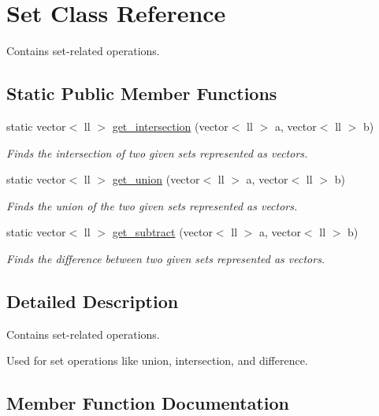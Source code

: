 \hypertarget{classSet}{}\section{Set Class Reference}
\label{classSet}


Contains set-\/related operations.  


\subsection*{Static Public Member Functions}
\begin{DoxyCompactItemize}
\item 
static vector$<$ ll $>$ \hyperlink{classSet_a0105f025b829badd1a308dda0111ea28}{get\+\_\+intersection} (vector$<$ ll $>$ a, vector$<$ ll $>$ b)
\begin{DoxyCompactList}\small\item\em Finds the intersection of two given sets represented as vectors. \end{DoxyCompactList}\item 
static vector$<$ ll $>$ \hyperlink{classSet_a02f3000f63dbbfcc1152ddaf780663c4}{get\+\_\+union} (vector$<$ ll $>$ a, vector$<$ ll $>$ b)
\begin{DoxyCompactList}\small\item\em Finds the union of the two given sets represented as vectors. \end{DoxyCompactList}\item 
static vector$<$ ll $>$ \hyperlink{classSet_af26ca0bfd2f6eb413c2265698801e5fd}{get\+\_\+subtract} (vector$<$ ll $>$ a, vector$<$ ll $>$ b)
\begin{DoxyCompactList}\small\item\em Finds the difference between two given sets represented as vectors. \end{DoxyCompactList}\end{DoxyCompactItemize}


\subsection{Detailed Description}
Contains set-\/related operations. 

Used for set operations like union, intersection, and difference. 

\subsection{Member Function Documentation}
\mbox{\label{classSet_a0105f025b829badd1a308dda0111ea28}} 
